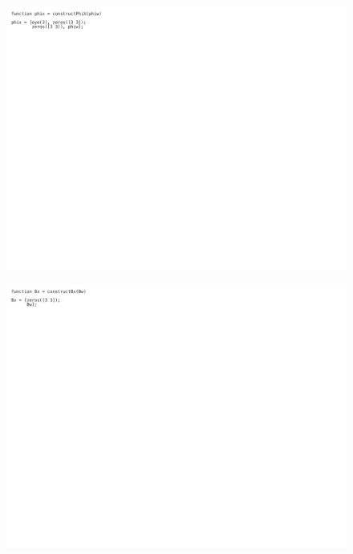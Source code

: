 \begin{figure}[H]
    \centering
    \captionsetup{ justification = centering }
    \includegraphics[trim={0cm 18cm 15cm 0cm},clip,width = 15cm]{Images/PS7/kalmanFilter-05.png}
\end{figure}

\begin{figure}[H]
    \centering
    \captionsetup{ justification = centering }
    \includegraphics[trim={0cm 18cm 15cm 0cm},clip,width = 15cm]{Images/PS7/kalmanFilter-06.png}
\end{figure}

